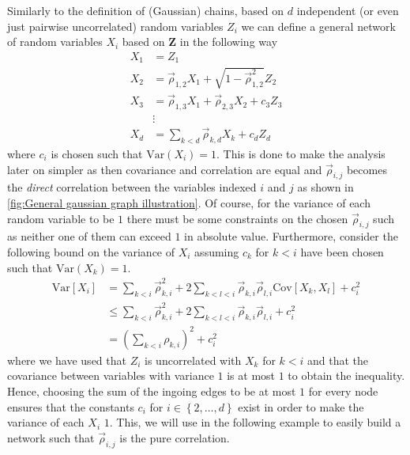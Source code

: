 \documentclass[../Thesis.tex]{subfiles}
\begin{document}
Similarly to the definition of (Gaussian) chains, based on $d$ independent (or even just pairwise uncorrelated) random variables $Z_i$ we can define a general network of random variables $X_i$ based on $\boldsymbol Z$ in the following way
\begin{equation}\label{eq:Gaussian network in terms of Z}
    \begin{split}
        X_1 & = Z_1                                                      \\
        X_2 & = \vec{\rho}_{1,2} X_1 + \sqrt{1 - \vec{\rho}_{1,2}^2} Z_2 \\
        X_3 & = \vec{\rho}_{1,3} X_1 + \vec{\rho}_{2,3} X_2 + c_3 Z_3    \\
            & \vdots                                                     \\
        X_d & = \sum_{k < d} \vec{\rho}_{k,d} X_k + c_d Z_d
    \end{split}
\end{equation}
where $c_i$ is chosen such that $\text{Var}\left(X_i\right) = 1$. This is done to make the analysis later on simpler as then covariance and correlation are equal and $\vec{\rho}_{i,j}$ becomes the \textit{direct} correlation between the variables indexed $i$ and $j$ as shown in \autoref{fig:General gaussian graph illustration}. Of course, for the variance of each random variable to be $1$ there must be some constraints on the chosen $\vec{\rho}_{i,j}$ such as neither one of them can exceed $1$ in absolute value. Furthermore, consider the following bound on the variance of $X_i$ assuming $c_k$ for $k < i$ have been chosen such that $\text{Var}\left(X_k\right) = 1$.
\begin{equation}\label{eq:bound on variance for network variable from the sum of ingoing weights}
    \begin{aligned}
        \text{Var}\left[X_i\right] & = \sum_{k < i} \vec{\rho}_{k,i}^2 + 2\sum_{k < l < i} \vec{\rho}_{k,i} \vec{\rho}_{l,i} \text{Cov} \left[X_k,X_l\right] + c_i^2 \\
                                   & \leq  \sum_{k < i} \vec{\rho}_{k,i}^2 + 2\sum_{k < l < i} \vec{\rho}_{k,i} \vec{\rho}_{l,i} + c_i^2                             \\
                                   & = \left(\sum_{k < i} \rho_{k,i}\right)^2 + c_i^2
    \end{aligned}
\end{equation}
where we have used that $Z_i$ is uncorrelated with $X_k$ for $k < i$ and that the covariance between variables with variance $1$ is at most $1$ to obtain the inequality. Hence, choosing the sum of the ingoing edges to be at most $1$ for every node ensures that the constants $c_i$ for $i\in\left\{2,\dots, d\right\}$ exist in order to make the variance of each $X_i$ $1$. This, we will use in the following example to easily build a network such that $\vec{\rho}_{i,j}$ is the pure correlation.
\end{document}
